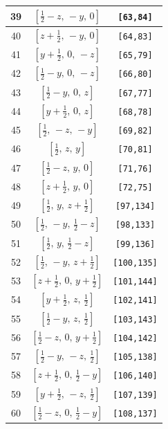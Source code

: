 \documentclass[fleqn,8pt]{jsarticle}
\begin{document}
\begin{longtable}{ccc}
39 & $\left[ \frac{1}{2} - z,\, - y,\, 0 \right]$ & {\tt [63,84]} \\ \hline
40 & $\left[ z + \frac{1}{2},\, - y,\, 0 \right]$ & {\tt [64,83]} \\ \hline
41 & $\left[ y + \frac{1}{2},\, 0,\, - z \right]$ & {\tt [65,79]} \\ \hline
42 & $\left[ \frac{1}{2} - y,\, 0,\, - z \right]$ & {\tt [66,80]} \\ \hline
43 & $\left[ \frac{1}{2} - y,\, 0,\, z \right]$ & {\tt [67,77]} \\ \hline
44 & $\left[ y + \frac{1}{2},\, 0,\, z \right]$ & {\tt [68,78]} \\ \hline
45 & $\left[ \frac{1}{2},\, - z,\, - y \right]$ & {\tt [69,82]} \\ \hline
46 & $\left[ \frac{1}{2},\, z,\, y \right]$ & {\tt [70,81]} \\ \hline
47 & $\left[ \frac{1}{2} - z,\, y,\, 0 \right]$ & {\tt [71,76]} \\ \hline
48 & $\left[ z + \frac{1}{2},\, y,\, 0 \right]$ & {\tt [72,75]} \\ \hline
49 & $\left[ \frac{1}{2},\, y,\, z + \frac{1}{2} \right]$ & {\tt [97,134]} \\ \hline
50 & $\left[ \frac{1}{2},\, - y,\, \frac{1}{2} - z \right]$ & {\tt [98,133]} \\ \hline
51 & $\left[ \frac{1}{2},\, y,\, \frac{1}{2} - z \right]$ & {\tt [99,136]} \\ \hline
52 & $\left[ \frac{1}{2},\, - y,\, z + \frac{1}{2} \right]$ & {\tt [100,135]} \\ \hline
53 & $\left[ z + \frac{1}{2},\, 0,\, y + \frac{1}{2} \right]$ & {\tt [101,144]} \\ \hline
54 & $\left[ y + \frac{1}{2},\, z,\, \frac{1}{2} \right]$ & {\tt [102,141]} \\ \hline
55 & $\left[ \frac{1}{2} - y,\, z,\, \frac{1}{2} \right]$ & {\tt [103,143]} \\ \hline
56 & $\left[ \frac{1}{2} - z,\, 0,\, y + \frac{1}{2} \right]$ & {\tt [104,142]} \\ \hline
57 & $\left[ \frac{1}{2} - y,\, - z,\, \frac{1}{2} \right]$ & {\tt [105,138]} \\ \hline
58 & $\left[ z + \frac{1}{2},\, 0,\, \frac{1}{2} - y \right]$ & {\tt [106,140]} \\ \hline
59 & $\left[ y + \frac{1}{2},\, - z,\, \frac{1}{2} \right]$ & {\tt [107,139]} \\ \hline
60 & $\left[ \frac{1}{2} - z,\, 0,\, \frac{1}{2} - y \right]$ & {\tt [108,137]} \\ \hline

\end{longtable}
\end{document}
